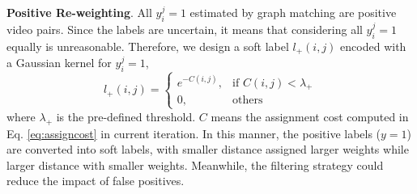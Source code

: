 \documentclass[10pt,twocolumn,letterpaper]{article}
\begin{document}
\textbf{Positive Re-weighting}. All $ y_i^j=1$ estimated by graph matching are positive video pairs. Since the labels are uncertain, it means that considering all $ y_i^j=1$ equally is unreasonable. Therefore, we design a soft label $l_+(i,j)$ encoded with a Gaussian kernel for $ y_i^j=1$,
\begin{equation}\label{eq:pos}
l_+(i,j) = \left\{ {\begin{array}{ll}
{e^{-C(i,j)}  ,} & {\textrm{if $C(i,j) < \lambda_+ $}}\\
{0,}   & {\textrm{others}}
\end{array}} \right.
\end{equation}
where $\lambda_+$ is the pre-defined threshold. $C$ means the assignment cost computed in Eq. \ref{eq:assigncost} in current iteration. In this manner, the positive labels ($y =1$) are converted into soft labels, with smaller distance assigned larger weights while larger distance with smaller weights. Meanwhile, the filtering strategy could reduce the impact of false positives.
\end{document}
